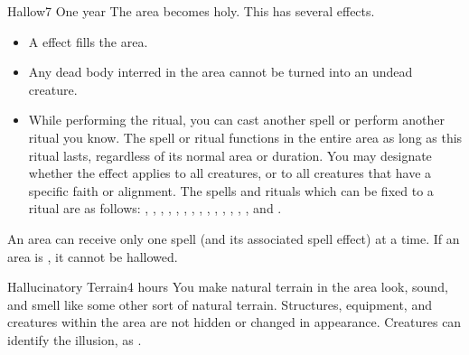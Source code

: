 \begin{spellsection}{Hallow}{7}
\spelldur One year
\spellline
\spelleffect The area becomes holy. This has several effects.
\begin{itemize}
    \item A  effect fills the area.
    \item Any dead body interred in the area cannot be turned into an undead creature.
    \item While performing the ritual, you can cast another spell or perform another ritual you know. The spell or ritual functions in the entire area as long as this ritual lasts, regardless of its normal area or duration. You may designate whether the effect applies to all creatures, or to all creatures that have a specific faith or alignment. The spells and rituals which can be fixed to a  ritual are as follows: , , , , , , , , , , , , , , and .
\end{itemize}
\spellnotes An area can receive only one  spell (and its associated spell effect) at a time. If an area is , it cannot be hallowed.
\end{spellsection}

\begin{spellsection}{Hallucinatory Terrain}{4}
 hours \dismissable
\spelleffect You make natural terrain in the area look, sound, and smell like some other sort of natural terrain. Structures, equipment, and creatures within the area are not hidden or changed in appearance.
\spellnotes Creatures can identify the illusion, as .
\end{spellsection}

